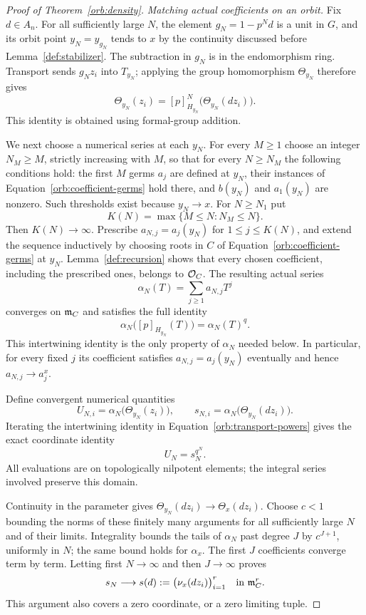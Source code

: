 \begin{proof}[Proof of Theorem~\ref{orb:density}]
\smallskip
\noindent\emph{Matching actual coefficients on an orbit.}
Fix $d\in A_n$.  For all sufficiently large $N$, the element
$g_N=1-p^Nd$ is a unit in $G$, and its orbit point $y_N=y_{g_N}$
tends to $x$ by the continuity discussed before Lemma~\ref{def:stabilizer}.  The subtraction in
$g_N$ is in the endomorphism ring.  Transport sends $g_Nz_i$ into
$T_{y_N}$; applying the group homomorphism $\Theta_{y_N}$ therefore
gives
\begin{equation}\label{orb:transport-powers}
 \Theta_{y_N}(z_i)
 =[p]_{H_{y_N}}^N\bigl(\Theta_{y_N}(dz_i)\bigr).
\end{equation}
This identity is obtained using formal-group addition.

We next choose a numerical series at each $y_N$.  For every $M\geq1$
choose an integer $N_M\geq M$, strictly increasing with $M$, so that
for every $N\geq N_M$ the following conditions hold: the first $M$
germs $a_j$ are defined at $y_N$, their instances of
Equation~\eqref{orb:coefficient-germs} hold there, and $b(y_N)$ and $a_1(y_N)$
are nonzero.  Such thresholds exist because $y_N\to x$.  For
$N\geq N_1$ put
\[
 K(N)=\max\{M\leq N:N_M\leq N\}.
\]
Then $K(N)\to\infty$.  Prescribe
$a_{N,j}=a_j(y_N)$ for $1\leq j\leq K(N)$, and extend the sequence
inductively by choosing roots in $C$ of
Equation~\eqref{orb:coefficient-germs} at $y_N$.  Lemma~\ref{def:recursion}
shows that every chosen coefficient, including the prescribed ones,
belongs to $\mathcal O_C$.  The resulting actual series
\[
 \alpha_N(T)=\sum_{j\geq1}a_{N,j}T^j
\]
converges on $\mathfrak m_C$ and satisfies the full identity
\[
 \alpha_N\bigl([p]_{H_{y_N}}(T)\bigr)=\alpha_N(T)^q.
\]
This intertwining identity is the only property of $\alpha_N$ needed
below.  In particular, for every fixed $j$ its coefficient satisfies
$a_{N,j}=a_j(y_N)$ eventually and hence $a_{N,j}\to a_j^x$.

Define convergent numerical quantities
\[
 U_{N,i}=\alpha_N\bigl(\Theta_{y_N}(z_i)\bigr),\qquad
 s_{N,i}=\alpha_N\bigl(\Theta_{y_N}(dz_i)\bigr).
\]
Iterating the intertwining identity in
Equation~\eqref{orb:transport-powers} gives the exact coordinate
identity
\begin{equation}\label{orb:rooted-coordinates}
 U_N=s_N^{q^N}.
\end{equation}
All evaluations are on topologically nilpotent elements; the integral
series involved preserve this domain.

Continuity in the parameter gives
$\Theta_{y_N}(dz_i)\to\Theta_x(dz_i)$.  Choose $c<1$ bounding the
norms of these finitely many arguments for all sufficiently large $N$
and of their limits.  Integrality bounds the tails of $\alpha_N$ past
degree $J$ by $c^{J+1}$, uniformly in $N$; the same bound holds for
$\alpha_x$.  The first $J$ coefficients converge term by term.  Letting
first $N\to\infty$ and then $J\to\infty$ proves
\begin{equation}\label{orb:limit-tuple}
 s_N\longrightarrow s(d):=\bigl(\nu_x(dz_i)\bigr)_{i=1}^r
 \quad\text{in }\mathfrak m_C^r.
\end{equation}
This argument also covers a zero coordinate, or a zero limiting tuple.


\end{proof}
